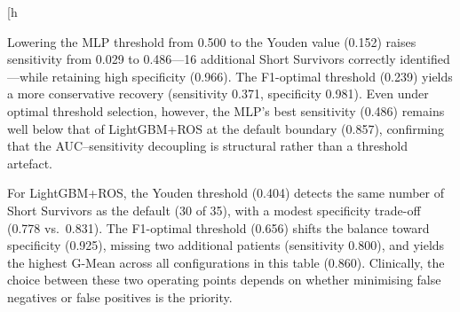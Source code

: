 \documentclass[preprint,12pt]{elsarticle}
\begin{document}
\begin{table}[h
  \caption{Test-set performance under three decision thresholds for MLP+None and
    LightGBM+ROS. Thresholds marked $\dagger$ were derived from out-of-fold CV
    predictions; the 0.50 row is the unmodified baseline from Table~\ref{tab:test}.
    The sensitivity-constrained strategy ($\geq 0.90$) returned degenerate thresholds
    ($\approx\!0$) for both classifiers, collapsing to predicting all patients as Short
    Survivors; it is excluded. TP\,/\,FN counts are out of 35 Short Survivors.}
  \label{tab:threshold}
\end{table}

Lowering the MLP threshold from 0.500 to the Youden value (0.152) raises
sensitivity from 0.029 to 0.486---16 additional Short Survivors correctly
identified---while retaining high specificity (0.966). The F1-optimal threshold
(0.239) yields a more conservative recovery (sensitivity 0.371, specificity 0.981).
Even under optimal threshold selection, however, the MLP's best sensitivity (0.486)
remains well below that of LightGBM+ROS at the default boundary (0.857),
confirming that the AUC--sensitivity decoupling is structural rather than a
threshold artefact.

For LightGBM+ROS, the Youden threshold (0.404) detects the same number of Short
Survivors as the default (30 of 35), with a modest specificity trade-off (0.778
vs.\ 0.831). The F1-optimal threshold (0.656) shifts the balance toward specificity
(0.925), missing two additional patients (sensitivity 0.800), and yields the highest
G-Mean across all configurations in this table (0.860). Clinically, the choice
between these two operating points depends on whether minimising false negatives
or false positives is the priority.
\end{document}

